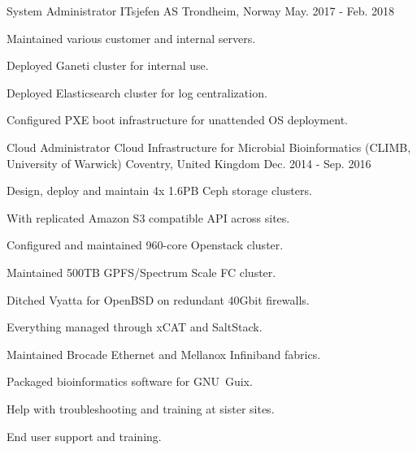 \begin{cventries}
  \cventry
    {System Administrator} %
    {ITsjefen AS}
    {Trondheim, Norway} %
    {May. 2017 - Feb. 2018} %
    {
      \begin{cvitems} %
        \item {Maintained various customer and internal servers.}
        \item {Deployed Ganeti cluster for internal use.}
        \item {Deployed Elasticsearch cluster for log centralization.}
        \item {Configured PXE boot infrastructure for unattended OS deployment.}
      \end{cvitems}
    }

  \cventry
    {Cloud Administrator} %
    {Cloud Infrastructure for Microbial Bioinformatics (CLIMB, University of Warwick)}
    {Coventry, United Kingdom} %
    {Dec. 2014 - Sep. 2016} %
    {
      \begin{cvitems} %
        \item {Design, deploy and maintain 4x 1.6PB Ceph storage clusters.}
        \item {With replicated Amazon S3 compatible API across sites.}
        \item {Configured and maintained 960-core Openstack cluster.}
        \item {Maintained 500TB GPFS/Spectrum Scale FC cluster.}
        \item {Ditched Vyatta for OpenBSD on redundant 40Gbit firewalls.}
        \item {Everything managed through xCAT and SaltStack.}
        \item {Maintained Brocade Ethernet and Mellanox Infiniband fabrics.}
        \item {Packaged bioinformatics software for GNU~Guix.}
        \item {Help with troubleshooting and training at sister sites.}
        \item {End user support and training.}
      \end{cvitems}
    }


\end{cventries}
